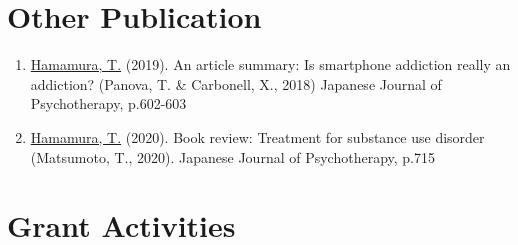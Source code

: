\documentclass[a4paper]{article}
\begin{document}
\section{Other Publication}
	\begin{enumerate}
		\item \underline{Hamamura, T.} (2019). An article summary: Is smartphone addiction really an addiction? (Panova, T. \& Carbonell, X., 2018) Japanese Journal of Psychotherapy, p.602-603
		\item \underline{Hamamura, T.} (2020). Book review: Treatment for substance use disorder (Matsumoto, T., 2020). Japanese Journal of Psychotherapy, p.715
	\end{enumerate}

\section{Grant Activities}
\end{document}
